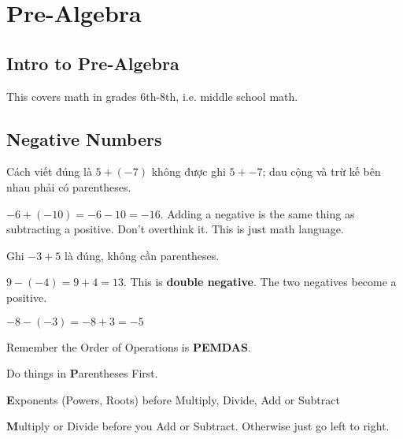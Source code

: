 \chapter{Pre-Algebra}

\section{Intro to Pre-Algebra}

This covers math in grades 6th-8th, i.e. middle school math.

\section{Negative Numbers}

Cách viết đúng là $5+ (-7)$ không được ghi $5 + -7$; dau cộng và trừ kế bên nhau phải có parentheses.

\(-6 + (-10)= -6 -10 = -16\). Adding a negative is the same thing as subtracting a positive. Don't overthink it. This is just math language.

Ghi $-3 + 5$ là đúng, không cần parentheses.

\vspace{1cm}

$9- (-4)=9+4=13$. This is \textbf{double negative}. The two negatives become a positive.

$-8 - (-3)=-8+3=-5$

\vspace{1cm}

Remember the Order of Operations is \textbf{PEMDAS}.

Do things in \textbf{P}arentheses First.

\textbf{E}xponents (Powers, Roots) before Multiply, Divide, Add or Subtract

\textbf{M}ultiply or Divide before you Add or Subtract. Otherwise just go left to right.

\vspace{9 mm}


